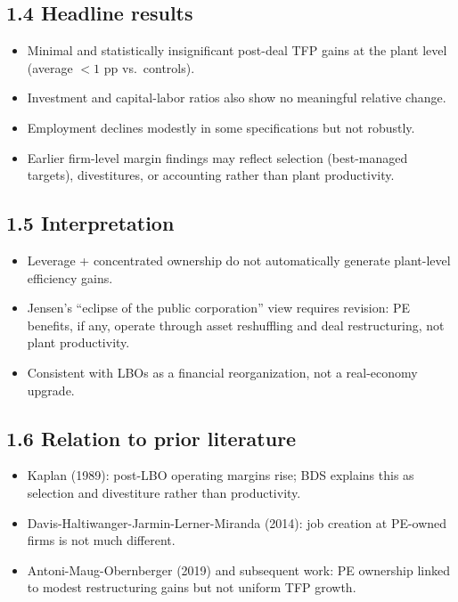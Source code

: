\documentclass[11pt]{article}
\begin{document}
\subsection*{1.4 Headline results}
\begin{itemize}
\item Minimal and statistically insignificant post-deal TFP gains at the plant level (average $<1$ pp vs.\ controls).
\item Investment and capital-labor ratios also show no meaningful relative change.
\item Employment declines modestly in some specifications but not robustly.
\item Earlier firm-level margin findings may reflect selection (best-managed targets), divestitures, or accounting rather than plant productivity.
\end{itemize}

\subsection*{1.5 Interpretation}
\begin{itemize}
\item Leverage + concentrated ownership do not automatically generate plant-level efficiency gains.
\item Jensen's ``eclipse of the public corporation'' view requires revision: PE benefits, if any, operate through asset reshuffling and deal restructuring, not plant productivity.
\item Consistent with LBOs as a financial reorganization, not a real-economy upgrade.
\end{itemize}

\subsection*{1.6 Relation to prior literature}
\begin{itemize}
\item Kaplan (1989): post-LBO operating margins rise; BDS explains this as selection and divestiture rather than productivity.
\item Davis-Haltiwanger-Jarmin-Lerner-Miranda (2014): job creation at PE-owned firms is not much different.
\item Antoni-Maug-Obernberger (2019) and subsequent work: PE ownership linked to modest restructuring gains but not uniform TFP growth.
\end{itemize}
\end{document}

